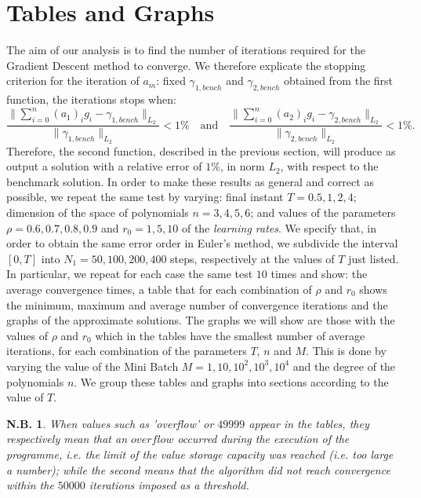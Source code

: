 \documentclass[a4paper,11pt,openright]{report}
\newtheorem{notabene}[teo]{N.B.}
\begin{document}
\section{Tables and Graphs}
The aim of our analysis is to find the number of iterations required for the Gradient Descent method to converge. We therefore explicate the stopping criterion for the iteration of $a_m$: fixed $\gamma_{1,bench}$ and $\gamma_{2, bench}$ obtained from the first function, the iterations stops when:
\[ 
\frac{\|\sum_{i=0}^n (a_1)_i g_i - \gamma_{1, bench} \|_{L_2}}{\| \gamma_{1, bench}\|_{L_2}} < 1\% \ \ \ \mbox{ and } \ \ \ \frac{\|\sum_{i=0}^n (a_2)_i g_i - \gamma_{2, bench} \|_{L_2}}{\| \gamma_{2, bench}\|_{L_2}} < 1\%.
\]
Therefore, the second function, described in the previous section, will produce as output a solution with a relative error of $1 \%$, in norm $L_2$, with respect to the benchmark solution. In order to make these results as general and correct as possible, we repeat the same test by varying: final instant $T = 0.5, 1, 2, 4$; dimension of the space of polynomials $n = 3, 4, 5, 6$; and values of the parameters $\rho = 0.6, 0.7, 0.8, 0.9$ and $r_0 = 1, 5, 10$ of the \emph{learning rates}. We specify that, in order to obtain the same error order in Euler's method, we subdivide the interval $[0,T]$ into $N_1 = 50, 100, 200, 400$ steps, respectively at the values of $T$ just listed. In particular, we repeat for each case the same test $10$ times and show: the average convergence times, a table that for each combination of $\rho$ and $r_0$ shows the minimum, maximum and average number of convergence iterations and the graphs of the approximate solutions. The graphs we will show are those with the values of $\rho$ and $r_0$ which in the tables have the smallest number of average iterations, for each combination of the parameters $T$, $n$ and $M$. This is done by varying the value of the Mini Batch $M = 1, 10, 10^2, 10^3, 10^4$ and the degree of the polynomials $n$. We group these tables and graphs into sections according to the value of $T$.

\begin{notabene}
When values such as 'overflow' or $49999$ appear in the tables, they respectively mean that an $overflow$ occurred during the execution of the programme, i.e. the limit of the value storage capacity was reached (i.e. too large a number); while the second means that the algorithm did not reach convergence within the $50000$ iterations imposed as a threshold.
\end{notabene}
\end{document}
